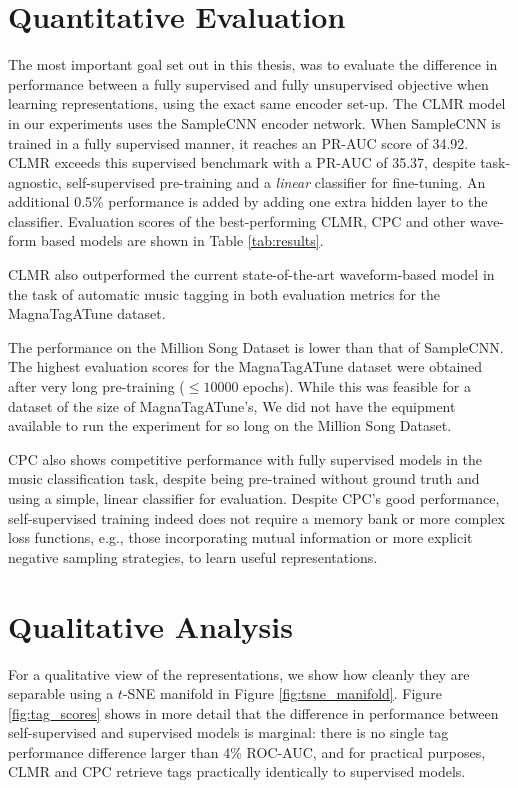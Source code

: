 \section{Quantitative Evaluation}
The most important goal set out in this thesis, was to evaluate the difference in performance between a fully supervised and fully unsupervised objective when learning representations, using the exact same encoder set-up. The CLMR model in our experiments uses the SampleCNN encoder network. When SampleCNN is trained in a fully supervised manner, it reaches an PR-AUC score of 34.92. CLMR exceeds this supervised benchmark with a PR-AUC of 35.37, despite task-agnostic, self-supervised pre-training and a \textit{linear} classifier for fine-tuning. An additional 0.5\% performance is added by adding one extra hidden layer to the classifier. Evaluation scores of the best-performing CLMR, CPC and other wave-form based models are shown in Table \ref{tab:results}.

CLMR also outperformed the current state-of-the-art waveform-based model in the task of automatic music tagging \cite{pons_end--end_2017} in both evaluation metrics for the MagnaTagATune dataset.

The performance on the Million Song Dataset is lower than that of SampleCNN. The highest evaluation scores for the MagnaTagATune dataset were obtained after very long pre-training ($\leq 10000$ epochs). While this was feasible for a dataset of the size of MagnaTagATune's, We did not have the equipment available to run the experiment for so long on the Million Song Dataset.

CPC also shows competitive performance with fully supervised models in the music classification task, despite being pre-trained without ground truth and using a simple, linear classifier for evaluation.
Despite CPC's good performance, self-supervised training indeed does not require a memory bank or more complex loss functions, e.g., those incorporating mutual information or more explicit negative sampling strategies, to learn useful representations.


\section{Qualitative Analysis}
For a qualitative view of the representations, we show how cleanly they are  separable using a $t$-SNE manifold in Figure \ref{fig:tsne_manifold}.
Figure \ref{fig:tag_scores} shows in more detail that the difference in performance between self-supervised and supervised models is marginal: there is no single tag performance difference larger than 4\% ROC-AUC, and for practical purposes, CLMR and CPC retrieve tags practically identically to supervised models.

